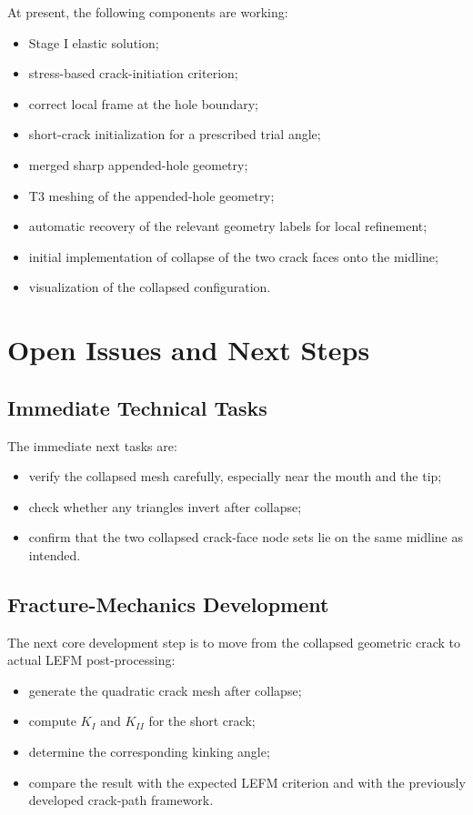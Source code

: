 \documentclass[11pt]{article}
\begin{document}
	At present, the following components are working:
	\begin{itemize}
		\item Stage I elastic solution;
		\item stress-based crack-initiation criterion;
		\item correct local frame at the hole boundary;
		\item short-crack initialization for a prescribed trial angle;
		\item merged sharp appended-hole geometry;
		\item T3 meshing of the appended-hole geometry;
		\item automatic recovery of the relevant geometry labels for local refinement;
		\item initial implementation of collapse of the two crack faces onto the midline;
		\item visualization of the collapsed configuration.
	\end{itemize}
	
	\section{Open Issues and Next Steps}
	
	\subsection{Immediate Technical Tasks}
	
	The immediate next tasks are:
	\begin{itemize}
		\item verify the collapsed mesh carefully, especially near the mouth and the tip;
		\item check whether any triangles invert after collapse;
		\item confirm that the two collapsed crack-face node sets lie on the same midline as intended.
	\end{itemize}
	
	\subsection{Fracture-Mechanics Development}
	
	The next core development step is to move from the collapsed geometric crack to actual LEFM post-processing:
	\begin{itemize}
		\item generate the quadratic crack mesh after collapse;
		\item compute $K_I$ and $K_{II}$ for the short crack;
		\item determine the corresponding kinking angle;
		\item compare the result with the expected LEFM criterion and with the previously developed crack-path framework.
	\end{itemize}
	
\end{document}
